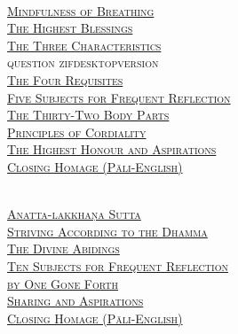 {  \clearpage

  {\libertinusFont\selectfont\textbf{\textsc{\fontsize{18}{12}\selectfont{}}}}\\

  \textsc{\fontsize{14.4}{28}\selectfont
    \hyperref[mindfulness-of-breathing]{Mindfulness of Breathing} \ifdesktopversion\else\pageref{mindfulness-of-breathing}\fi\\
    \hyperref[highest-blessings]{The Highest Blessings} \ifdesktopversion\else\pageref{highest-blessings}\fi\\
    \hyperref[three-characteristics]{The Three Characteristics} \\question{ z}ifdesktopversion\else\pageref{three-characteristics}\fi\\
    \hyperref[four-requisites]{The Four Requisites} \ifdesktopversion\else\pageref{four-requisites}\fi\\
    \hyperref[five-reflections]{Five Subjects for Frequent Reflection} \ifdesktopversion\else\pageref{five-reflections}\fi\\
    \hyperref[32-parts]{The Thirty-Two Body Parts} \ifdesktopversion\else\pageref{32-parts}\fi\\
    \hyperref[principles-of-cordiality]{Principles of Cordiality} \ifdesktopversion\else\pageref{principles-of-cordiality}\fi\\
    \hyperref[highest-honour-aspirations]{The Highest Honour and Aspirations} \ifdesktopversion\else\pageref{highest-honour-aspirations}\fi\\
    \hyperref[closing-homage]{Closing Homage (Pāli-English)} \ifdesktopversion\else\pageref{closing-homage}\fi\\
  }

  \vspace{1.0cm}

  {\libertinusFont\selectfont\textbf{\textsc{\fontsize{18}{12}\selectfont{}}}}\\

  \textsc{\fontsize{14.4}{28}\selectfont
    \hyperref[anatta-lakkhana]{Anatta-lakkhaṇa Sutta} \ifdesktopversion\else\pageref{anatta-lakkhana}\fi\\
    \hyperref[striving-according-to-dhamma]{Striving According to the Dhamma} \ifdesktopversion\else\pageref{striving-according-to-dhamma}\fi\\
    \hyperref[divine-abidings]{The Divine Abidings} \ifdesktopversion\else\pageref{divine-abidings}\fi\\
    \hyperref[ten-reflections]{Ten Subjects for Frequent Reflection\\ \vspace{-0.4cm} by One Gone Forth} \ifdesktopversion\else\pageref{ten-reflections}\fi\\
    \hyperref[sharing-aspirations]{Sharing and Aspirations} \ifdesktopversion\else\pageref{sharing-aspirations}\fi\\
    \hyperref[closing-homage]{Closing Homage (Pāli-English)} \ifdesktopversion\else\pageref{closing-homage}\fi\\
  }

}
